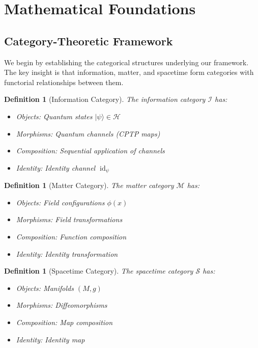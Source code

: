 \documentclass[12pt]{article}
\newtheorem{definition}[theorem]{Definition}
\DeclareMathOperator{\id}{id}
\begin{document}
\section{Mathematical Foundations}

\subsection{Category-Theoretic Framework}

We begin by establishing the categorical structures underlying our framework. The key insight is that information, matter, and spacetime form categories with functorial relationships between them.

\begin{definition}[Information Category]
The information category $\mathcal{I}$ has:
\begin{itemize}
\item Objects: Quantum states $|\psi\rangle \in \mathcal{H}$
\item Morphisms: Quantum channels (CPTP maps)
\item Composition: Sequential application of channels
\item Identity: Identity channel $\id_\psi$
\end{itemize}
\end{definition}

\begin{definition}[Matter Category]
The matter category $\mathcal{M}$ has:
\begin{itemize}
\item Objects: Field configurations $\phi(x)$
\item Morphisms: Field transformations
\item Composition: Function composition
\item Identity: Identity transformation
\end{itemize}
\end{definition}

\begin{definition}[Spacetime Category]
The spacetime category $\mathcal{S}$ has:
\begin{itemize}
\item Objects: Manifolds $(M, g)$
\item Morphisms: Diffeomorphisms
\item Composition: Map composition
\item Identity: Identity map
\end{itemize}
\end{definition}
\end{document}
